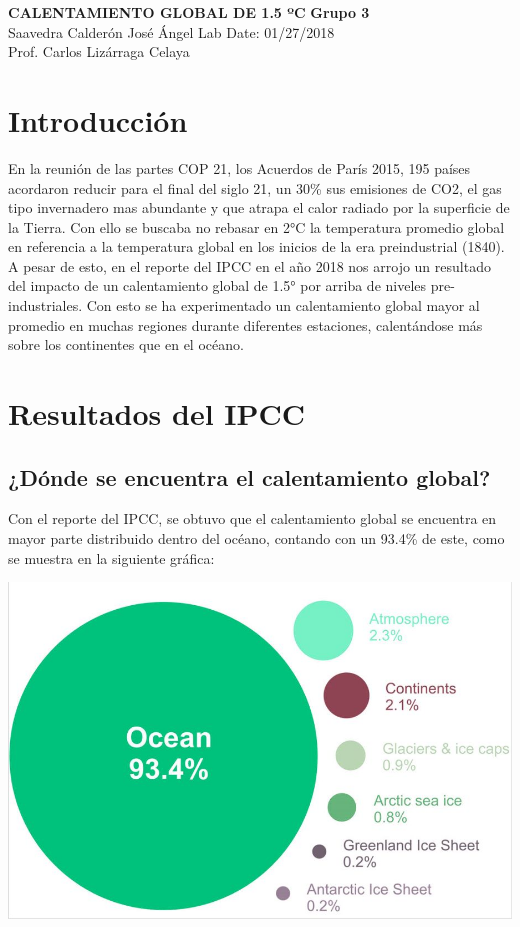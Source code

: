 \documentclass[6pt, spanish]{report}
\begin{document}
\noindent
\large\textbf{CALENTAMIENTO GLOBAL DE 1.5 ºC} 
\hfill \textbf{Grupo 3} \\
\normalsize
Saavedra Calderón José Ángel
 \hfill Lab Date: 01/27/2018 \\
\hfill Prof. Carlos Lizárraga Celaya

\section*{Introducción}
En la reunión de las partes COP 21, los Acuerdos de París 2015, 195 países acordaron reducir para el final del siglo 21, un 30\% sus emisiones de CO2, el gas tipo invernadero mas abundante y que atrapa el calor radiado por la superficie de la Tierra. Con ello se buscaba no rebasar en 2°C la temperatura promedio global en referencia a la temperatura global en los inicios de la era preindustrial (1840).
A pesar de esto, en el reporte del IPCC en el año 2018 nos arrojo un resultado del impacto de un calentamiento global de 1.5° por arriba de niveles pre-industriales. Con esto se ha experimentado un calentamiento global mayor al promedio en muchas regiones durante diferentes estaciones, calentándose más sobre los continentes que en el océano. 



\section*{Resultados del IPCC}

\subsection*{¿Dónde se encuentra el calentamiento global?}
Con el reporte del IPCC, se obtuvo que el calentamiento global se encuentra en mayor parte distribuido dentro del océano, contando con un 93.4\% de este, como se muestra en la siguiente gráfica:


\begin{center}\vspace{.2cm}
\includegraphics[width=.2\linewidth]{Grafica1.jpg}
\end{center}\vspace{.2cm}
\end{document}
